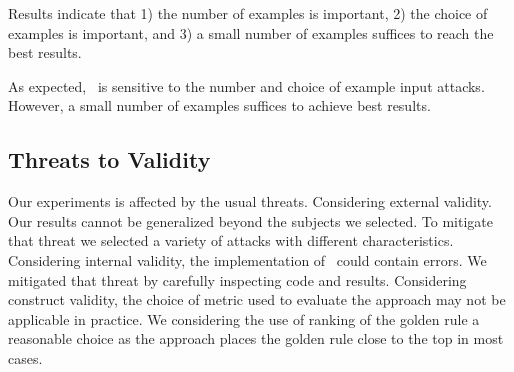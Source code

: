 \documentclass[sigconf,review, anonymous]{acmart}
\begin{document}
Results indicate that 1) the number of examples is important, 2) the
choice of examples is important, and 3) a small number of examples
suffices to reach the best results.

\begin{center}
\begin{tcolorbox}[enhanced,width=3.3in,center upper,drop shadow southwest,sharp corners]
As expected, \tname\ is sensitive to the number and choice of example
input attacks. However, a small number of examples suffices to achieve
best results.
\end{tcolorbox}
\end{center}



\subsection{Threats to Validity}
\label{sec:threats}

Our experiments is affected by the usual threats. Considering external
validity. Our results cannot be generalized beyond the subjects we
selected. To mitigate that threat we selected a variety of attacks
with different characteristics. Considering internal validity, the
implementation of \tname\ could contain errors. We mitigated that
threat by carefully inspecting code and results. Considering construct
validity, the choice of metric used to evaluate the approach may not
be applicable in practice. We considering the use of ranking of the
golden rule a reasonable choice as the approach places the golden rule
close to the top in most cases.
\end{document}
